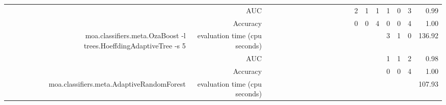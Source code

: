 \documentclass{article}
\providecommand{\tabularnewline}{\\}
\begin{document}
\begin{sidewaystable}
\begin{tabular}{|r|r|rrrrrr|r|r|r|r|r|r|r|r|r|r|r|r|r|}
 \cline{2-2} \cline{15-21}
 & AUC & \multicolumn{1}{r}{} & \multicolumn{1}{r}{} & \multicolumn{1}{r}{} & \multicolumn{1}{r}{} & \multicolumn{1}{r}{} & \multicolumn{1}{r}{} & \multicolumn{1}{r}{} & \multicolumn{1}{r}{} & \multicolumn{1}{r}{} & \multicolumn{1}{r}{} & \multicolumn{1}{r}{} & \multicolumn{1}{r|}{} & \multicolumn{1}{r|}{2} & \multicolumn{1}{r|}{1} & \multicolumn{1}{r|}{1} & \multicolumn{1}{r|}{1} & \multicolumn{1}{r|}{0} & \multicolumn{1}{r|}{3} & 0.99\tabularnewline
 \cline{2-2} \cline{15-21}
 & Accuracy & \multicolumn{1}{r}{} & \multicolumn{1}{r}{} & \multicolumn{1}{r}{} & \multicolumn{1}{r}{} & \multicolumn{1}{r}{} & \multicolumn{1}{r}{} & \multicolumn{1}{r}{} & \multicolumn{1}{r}{} & \multicolumn{1}{r}{} & \multicolumn{1}{r}{} & \multicolumn{1}{r}{} & \multicolumn{1}{r|}{} & \multicolumn{1}{r|}{0} & \multicolumn{1}{r|}{0} & \multicolumn{1}{r|}{4} & \multicolumn{1}{r|}{0} & \multicolumn{1}{r|}{0} & \multicolumn{1}{r|}{4} & 1.00\tabularnewline
 \cline{1-2} \cline{15-21}
\multirow{3}{*}{moa.classifiers.meta.OzaBoost -l trees.HoeffdingAdaptiveTree -s 5} & evaluation time (cpu seconds) & \multicolumn{1}{r}{} & \multicolumn{1}{r}{} & \multicolumn{1}{r}{} & \multicolumn{1}{r}{} & \multicolumn{1}{r}{} & \multicolumn{1}{r}{} & \multicolumn{1}{r}{} & \multicolumn{1}{r}{} & \multicolumn{1}{r}{} & \multicolumn{1}{r}{} & \multicolumn{1}{r}{} & \multicolumn{1}{r}{} & \multicolumn{1}{r}{} & \multicolumn{1}{r}{} & \multicolumn{1}{r|}{} & \multicolumn{1}{r|}{3} & \multicolumn{1}{r|}{1} & \multicolumn{1}{r|}{0} & 136.92\tabularnewline
 \cline{2-2} \cline{18-21}
 & AUC & \multicolumn{1}{r}{} & \multicolumn{1}{r}{} & \multicolumn{1}{r}{} & \multicolumn{1}{r}{} & \multicolumn{1}{r}{} & \multicolumn{1}{r}{} & \multicolumn{1}{r}{} & \multicolumn{1}{r}{} & \multicolumn{1}{r}{} & \multicolumn{1}{r}{} & \multicolumn{1}{r}{} & \multicolumn{1}{r}{} & \multicolumn{1}{r}{} & \multicolumn{1}{r}{} & \multicolumn{1}{r|}{} & \multicolumn{1}{r|}{1} & \multicolumn{1}{r|}{1} & \multicolumn{1}{r|}{2} & 0.98\tabularnewline
 \cline{2-2} \cline{18-21}
 & Accuracy & \multicolumn{1}{r}{} & \multicolumn{1}{r}{} & \multicolumn{1}{r}{} & \multicolumn{1}{r}{} & \multicolumn{1}{r}{} & \multicolumn{1}{r}{} & \multicolumn{1}{r}{} & \multicolumn{1}{r}{} & \multicolumn{1}{r}{} & \multicolumn{1}{r}{} & \multicolumn{1}{r}{} & \multicolumn{1}{r}{} & \multicolumn{1}{r}{} & \multicolumn{1}{r}{} & \multicolumn{1}{r|}{} & \multicolumn{1}{r|}{0} & \multicolumn{1}{r|}{0} & \multicolumn{1}{r|}{4} & 1.00\tabularnewline
 \cline{1-2} \cline{18-21}
\multirow{3}{*}{moa.classifiers.meta.AdaptiveRandomForest} & evaluation time (cpu seconds) & \multicolumn{1}{r}{} & \multicolumn{1}{r}{} & \multicolumn{1}{r}{} & \multicolumn{1}{r}{} & \multicolumn{1}{r}{} & \multicolumn{1}{r}{} & \multicolumn{1}{r}{} & \multicolumn{1}{r}{} & \multicolumn{1}{r}{} & \multicolumn{1}{r}{} & \multicolumn{1}{r}{} & \multicolumn{1}{r}{} & \multicolumn{1}{r}{} & \multicolumn{1}{r}{} & \multicolumn{1}{r}{} & \multicolumn{1}{r}{} & \multicolumn{1}{r}{} & \multicolumn{1}{r|}{} & 107.93\tabularnewline

\end{tabular}
\end{sidewaystable}
\end{document}
